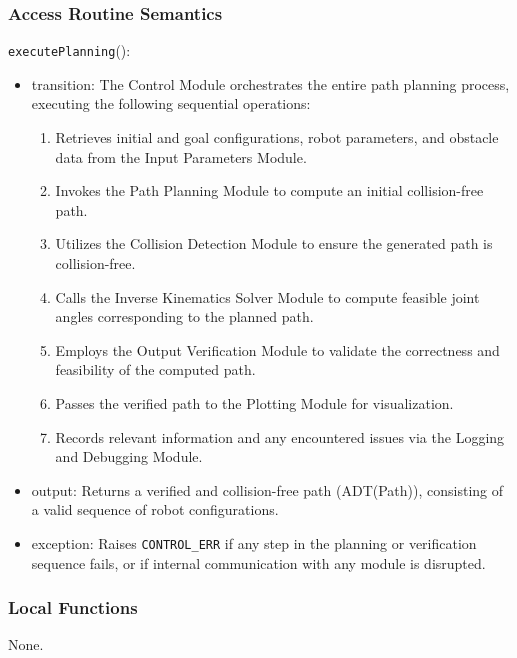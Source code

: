 \documentclass[12pt, titlepage]{article}
\begin{document}
\subsubsection{Access Routine Semantics}

\noindent \texttt{executePlanning}():
\begin{itemize}
    \item transition: The Control Module orchestrates the entire path planning process, executing the following sequential operations:
    
    \begin{enumerate}
        \item Retrieves initial and goal configurations, robot parameters, and obstacle data from the Input Parameters Module.
        \item Invokes the Path Planning Module to compute an initial collision-free path.
        \item Utilizes the Collision Detection Module to ensure the generated path is collision-free.
        \item Calls the Inverse Kinematics Solver Module to compute feasible joint angles corresponding to the planned path.
        \item Employs the Output Verification Module to validate the correctness and feasibility of the computed path.
        \item Passes the verified path to the Plotting Module for visualization.
        \item Records relevant information and any encountered issues via the Logging and Debugging Module.
    \end{enumerate}

    \item output: Returns a verified and collision-free path (ADT(Path)), consisting of a valid sequence of robot configurations.
    
    \item exception: Raises \texttt{CONTROL\_ERR} if any step in the planning or verification sequence fails, or if internal communication with any module is disrupted.
\end{itemize}

\subsubsection{Local Functions}

None.




\newpage
\end{document}
